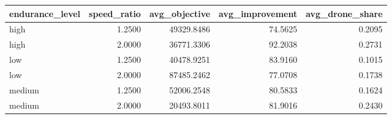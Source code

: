 \begin{tabular}{lrrrr}
\toprule
endurance_level & speed_ratio & avg_objective & avg_improvement & avg_drone_share \\
\midrule
high & 1.2500 & 49329.8486 & 74.5625 & 0.2095 \\
high & 2.0000 & 36771.3306 & 92.2038 & 0.2731 \\
low & 1.2500 & 40478.9251 & 83.9160 & 0.1015 \\
low & 2.0000 & 87485.2462 & 77.0708 & 0.1738 \\
medium & 1.2500 & 52006.2548 & 80.5833 & 0.1624 \\
medium & 2.0000 & 20493.8011 & 81.9016 & 0.2430 \\
\bottomrule
\end{tabular}
